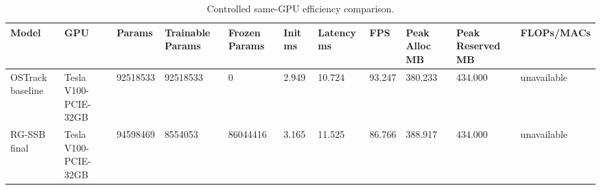\begin{table}[t]
\centering
\caption{Controlled same-GPU efficiency comparison.}
\label{tab:efficiency}
\begin{tabular}{lllllllllll}
\toprule
Model & GPU & Params & Trainable Params & Frozen Params & Init ms & Latency ms & FPS & Peak Alloc MB & Peak Reserved MB & FLOPs/MACs \\
\midrule
OSTrack baseline & Tesla V100-PCIE-32GB & 92518533 & 92518533 & 0 & 2.949 & 10.724 & 93.247 & 380.233 & 434.000 & unavailable \\
RG-SSB final & Tesla V100-PCIE-32GB & 94598469 & 8554053 & 86044416 & 3.165 & 11.525 & 86.766 & 388.917 & 434.000 & unavailable \\
\bottomrule
\end{tabular}
\end{table}
